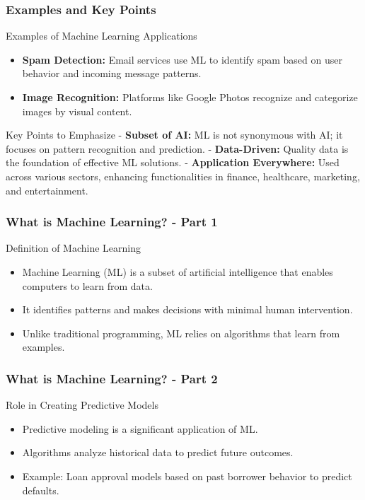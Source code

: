 \documentclass{beamer}
\begin{document}
\begin{frame}[fragile]
    \frametitle{Examples and Key Points}
    \begin{block}{Examples of Machine Learning Applications}
        \begin{itemize}
            \item \textbf{Spam Detection:} Email services use ML to identify spam based on user behavior and incoming message patterns.
            \item \textbf{Image Recognition:} Platforms like Google Photos recognize and categorize images by visual content.
        \end{itemize}
    \end{block}

    \begin{block}{Key Points to Emphasize}
        - \textbf{Subset of AI:} ML is not synonymous with AI; it focuses on pattern recognition and prediction.
        - \textbf{Data-Driven:} Quality data is the foundation of effective ML solutions.
        - \textbf{Application Everywhere:} Used across various sectors, enhancing functionalities in finance, healthcare, marketing, and entertainment.
    \end{block}
\end{frame}

\begin{frame}[fragile]
    \frametitle{What is Machine Learning? - Part 1}
    \begin{block}{Definition of Machine Learning}
        \begin{itemize}
            \item Machine Learning (ML) is a subset of artificial intelligence that enables computers to learn from data.
            \item It identifies patterns and makes decisions with minimal human intervention.
            \item Unlike traditional programming, ML relies on algorithms that learn from examples.
        \end{itemize}
    \end{block}
\end{frame}

\begin{frame}[fragile]
    \frametitle{What is Machine Learning? - Part 2}
    \begin{block}{Role in Creating Predictive Models}
        \begin{itemize}
            \item Predictive modeling is a significant application of ML.
            \item Algorithms analyze historical data to predict future outcomes.
            \item Example: Loan approval models based on past borrower behavior to predict defaults.
        \end{itemize}
    \end{block}
\end{frame}
\end{document}
